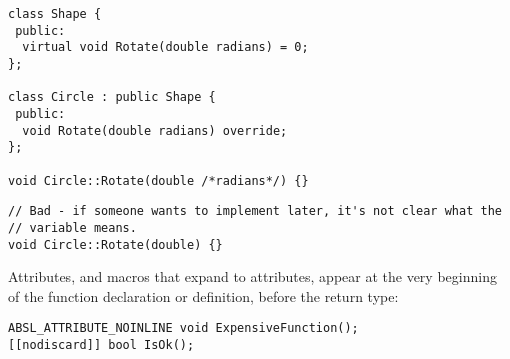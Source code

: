 \begin{verbatim}
class Shape {
 public:
  virtual void Rotate(double radians) = 0;
};

class Circle : public Shape {
 public:
  void Rotate(double radians) override;
};

void Circle::Rotate(double /*radians*/) {}
\end{verbatim}
\begin{verbatim}
// Bad - if someone wants to implement later, it's not clear what the
// variable means.
void Circle::Rotate(double) {}
\end{verbatim}

Attributes, and macros that expand to attributes, appear at the very beginning of the function declaration or definition, before the return type:
\begin{verbatim}
ABSL_ATTRIBUTE_NOINLINE void ExpensiveFunction();
[[nodiscard]] bool IsOk();
\end{verbatim}
